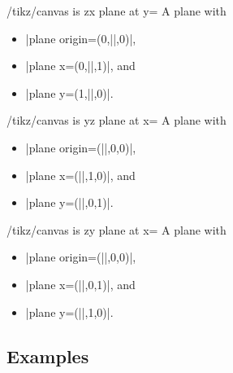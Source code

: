 \begin{key}{/tikz/canvas is zx plane at y=}
  A plane with
  \begin{itemize}
  \item |plane origin={(0,||,0)}|,
  \item |plane x={(0,||,1)}|, and
  \item |plane y={(1,||,0)}|.
  \end{itemize}
\end{key}

\begin{key}{/tikz/canvas is yz plane at x=}
  A plane with
  \begin{itemize}
  \item |plane origin={(||,0,0)}|,
  \item |plane x={(||,1,0)}|, and
  \item |plane y={(||,0,1)}|.
  \end{itemize}
\end{key}

\begin{key}{/tikz/canvas is zy plane at x=}
  A plane with
  \begin{itemize}
  \item |plane origin={(||,0,0)}|,
  \item |plane x={(||,0,1)}|, and
  \item |plane y={(||,1,0)}|.
  \end{itemize}
\end{key}

\subsection{Examples}

